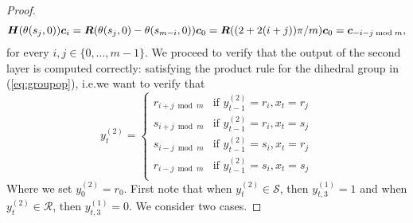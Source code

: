 \documentclass{article} %
\begin{document}
\begin{proof}
\begin{equation}
\begin{aligned}
     {\bm{H}}(\theta(s_j,0)){\bm{c}}_i &= {\bm{R}}( \theta(s_j,0) - \theta(s_{m-i},0)){\bm{c}}_0   = {\bm{R}}((2+ 2(i+j))\pi/m){\bm{c}}_0 = {\bm{c}}_{-i-j \bmod m}, \\
\end{aligned}    
\end{equation}
for every $i,j \in \{0,\dots, m-1\}$.
We proceed to verify that the output of the second layer is computed correctly: satisfying the product rule for the dihedral group in (\ref{eq:groupop}), i.e.\@ we want to verify that
\begin{equation}\label{eq:correctupdate}
    y^{(2)}_t = \begin{cases}
     r_{i + j \bmod m} & \text{if } y^{(2)}_{t-1} = r_i, x_t = r_j   \\
     s_{i + j \bmod m} & \text{if } y^{(2)}_{t-1} = r_i, x_t = s_j   \\
     s_{i - j \bmod m} & \text{if } y^{(2)}_{t-1} = s_i, x_t = r_j   \\
     r_{i - j \bmod m} & \text{if } y^{(2)}_{t-1} = s_i, x_t = s_j   \\
    \end{cases}
\end{equation}
Where we set $y^{(2)}_0 = r_0$. First note that  when $y^{(2)}_t \in \mathcal{S}$, then $y^{(1)}_{t,3} = 1$ and when $y^{(2)}_t \in \mathcal{R}$, then $y^{(1)}_{t,3} = 0$.
We consider two cases.


\end{proof}
\end{document}
